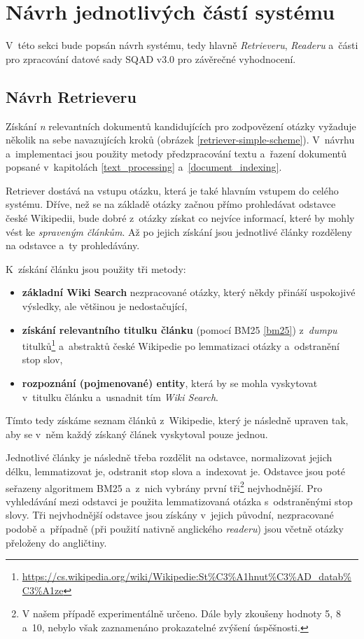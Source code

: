 \section{Návrh jednotlivých částí systému}
\label{design}
V~této sekci bude popsán návrh systému, tedy hlavně \emph{Retrieveru}, \emph{Readeru} a~části pro zpracování datové sady SQAD v3.0 \cite{sqad} pro závěrečné vyhodnocení.

\subsection{Návrh Retrieveru}
Získání \emph{n} relevantních dokumentů kandidujících pro zodpovězení otázky vyžaduje několik na sebe navazujících kroků (obrázek \ref{retriever-simple-scheme}). V~návrhu a~implementaci jsou použity metody předzpracování textu a~řazení dokumentů popsané v~kapitolách \ref{text_processing} a~\ref{document_indexing}.\par
Retriever dostává na vstupu otázku, která je také hlavním vstupem do celého systému. Dříve, než se na základě otázky začnou přímo prohledávat odstavce české Wikipedii, bude dobré z~otázky získat co nejvíce informací, které by mohly vést ke \emph{spraveným článkům}. Až po jejich získání jsou jednotlivé články rozděleny na odstavce a~ty prohledávány.\par
\noindent K~získání článku jsou použity tři metody:
\begin{itemize}
    \item \textbf{základní Wiki Search} nezpracované otázky, který někdy přináší uspokojivé výsledky, ale většinou je nedostačující,
    \item \textbf{získání relevantního titulku článku} (pomocí BM25 \ref{bm25}) z~\emph{dumpu} titulků\footnote{\url{https://cs.wikipedia.org/wiki/Wikipedie:St\%C3\%A1hnut\%C3\%AD_datab\%C3\%A1ze}} a~abstraktů české Wikipedie po lemmatizaci otázky a~odstranění stop slov,
    \item \textbf{rozpoznání (pojmenované) entity}, která by se mohla vyskytovat v~titulku článku a~usnadnit tím \emph{Wiki Search}.
\end{itemize}
Tímto tedy získáme seznam článků z~Wikipedie, který je následně upraven tak, aby se v~něm každý získaný článek vyskytoval pouze jednou.\par
Jednotlivé články je následně třeba rozdělit na odstavce, normalizovat jejich délku, lemmatizovat je, odstranit stop slova a~indexovat je. Odstavce jsou poté seřazeny algoritmem BM25 a~z~nich vybrány první tři\footnote{V našem případě experimentálně určeno. Dále byly zkoušeny hodnoty 5, 8 a~10, nebylo však zaznamenáno prokazatelné zvýšení úspěšnosti.} nejvhodnější. Pro vyhledávání mezi odstavci je použita lemmatizovaná otázka s~odstraněnými stop slovy. Tři nejvhodnější odstavce jsou získány v~jejich původní, nezpracované podobě a~případně (při použití nativně anglického \emph{readeru}) jsou včetně otázky přeloženy do angličtiny.

